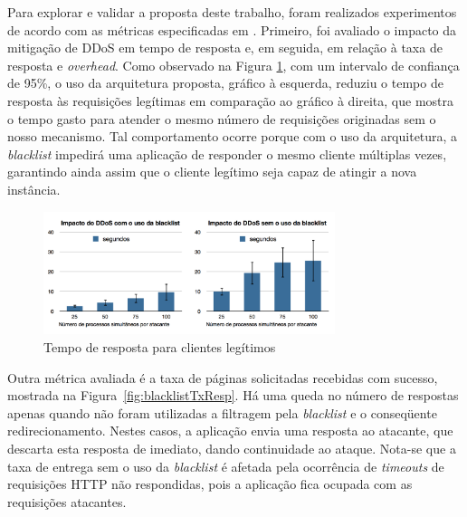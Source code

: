 


Para explorar e validar a proposta deste trabalho, foram realizados experimentos de acordo com as métricas especificadas em \cite{4600003}. Primeiro, foi avaliado o impacto da mitigação de DDoS em tempo de resposta e, em seguida, em relação à taxa de resposta e \emph{overhead}. 
%
%
Como observado na Figura \ref{fig:blacklistSecs}, com um intervalo de confiança de 95\%, o uso da arquitetura proposta, gráfico à esquerda, reduziu o tempo de resposta às requisições legítimas em comparação ao gráfico à direita, que mostra o tempo gasto para atender o mesmo número de requisições originadas sem o nosso mecanismo. Tal comportamento ocorre porque com o uso da arquitetura, a \emph{blacklist} impedirá uma aplicação de responder o mesmo cliente múltiplas vezes, garantindo ainda assim que o cliente legítimo seja capaz de atingir a nova instância.

\begin{figure}[h!]
\centering
\includegraphics[width=0.76\textwidth]{images/blacklistSecs.png}
\caption{Tempo de resposta para clientes legítimos}
\label{fig:blacklistSecs}
\end{figure}




Outra métrica avaliada é a taxa de páginas solicitadas recebidas com sucesso, mostrada na Figura~\ref{fig:blacklistTxResp}. Há uma queda no número de respostas apenas quando não foram utilizadas a filtragem pela \emph{blacklist} e o conseqüente redirecionamento. Nestes casos, a aplicação envia uma resposta ao atacante, que descarta esta resposta de imediato, dando continuidade ao ataque. Nota-se que a taxa de entrega sem o uso da \emph{blacklist} é afetada pela ocorrência de \emph{timeouts} de requisições HTTP não respondidas, pois a aplicação fica ocupada com as requisições atacantes.


